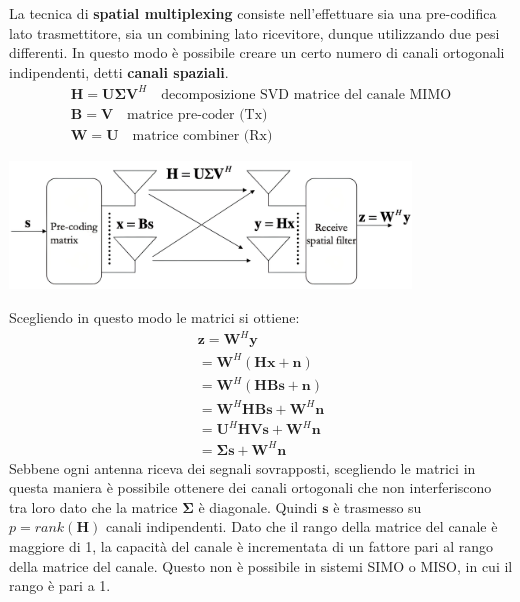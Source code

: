 La tecnica di \textbf{spatial multiplexing} consiste nell'effettuare sia una pre-codifica lato trasmettitore, sia un combining lato ricevitore, dunque utilizzando due pesi differenti. In questo modo è possibile creare un certo numero di canali ortogonali indipendenti, detti \textbf{canali spaziali}.
\[
    \begin{array}{ll}
        \mathbf{H} = \mathbf{U} \mathbf{\Sigma} \mathbf{V}^H \quad \text{decomposizione SVD matrice del canale MIMO} \\
        \mathbf{B} = \mathbf{V} \quad \text{matrice pre-coder (Tx)} \\
        \mathbf{W} = \mathbf{U} \quad \text{matrice combiner (Rx)}
    \end{array}
\]
\begin{center}
    \includegraphics[width=0.8\textwidth]{imgs/mimo.jpg}
\end{center}

Scegliendo in questo modo le matrici si ottiene:
\[
    \begin{array}{ll}
        \mathbf{z} = \mathbf{W}^H \mathbf{y}  \\
        = \mathbf{W}^H \left( \mathbf{H} \mathbf{x} + \mathbf{n}  \right) \\  
        = \mathbf{W}^H \left( \mathbf{H} \mathbf{B} \mathbf{s} + \mathbf{n} \right) \\
        = \mathbf{W}^H \mathbf{H} \mathbf{B} \mathbf{s} + \mathbf{W}^H \mathbf{n}  \\
        = \mathbf{U}^H \mathbf{H} \mathbf{V} \mathbf{s} + \mathbf{W}^H \mathbf{n} \\
        = \mathbf{\Sigma} \mathbf{s} + \mathbf{W}^H \mathbf{n}
    \end{array}
\]
Sebbene ogni antenna riceva dei segnali sovrapposti, scegliendo le matrici in questa maniera è possibile ottenere dei canali ortogonali che non interferiscono tra loro dato che la matrice $\mathbf{\Sigma}$ è diagonale.
Quindi $\mathbf{s}$ è trasmesso su $p = rank(\mathbf{H})$ canali indipendenti.
Dato che il rango della matrice del canale è maggiore di 1, la capacità del canale è incrementata di un fattore pari al rango della matrice del canale. Questo non è possibile in sistemi SIMO o MISO, in cui il rango è pari a 1.


